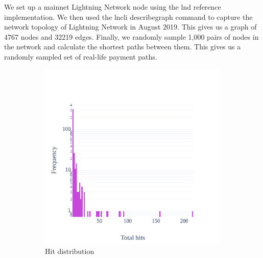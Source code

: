 \documentclass[USenglish,oneside,twocolumn]{article}
\begin{document}
We set up a mainnet Lightning Network node using the \textsf{lnd} \cite{github2019lnd} reference implementation. We then used the \textsf{lncli describegraph} command to capture the network topology of Lightning Network in August 2019. This gives us a graph of 4767 nodes and 32219 edges. Finally, we randomly sample 1,000 pairs of nodes in the network and calculate the shortest paths between them. This gives us a randomly sampled set of real-life payment paths.
\begin{figure}[t]
    \centering
    \begin{subfigure}[b]{0.3\textwidth}
        \includegraphics[width=\textwidth]{graphics/pl-hitcount.png}
        \caption{Hit distribution}
        \label{fig:hitcount}
    \end{subfigure}
    \begin{subfigure}[b]{0.3\textwidth}

\end{subfigure}
\end{figure}
\end{document}
